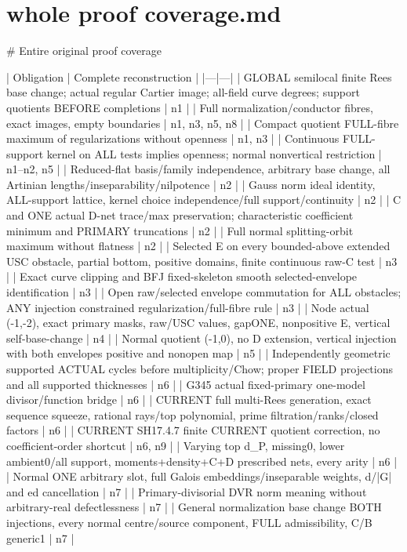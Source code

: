 \documentclass[11pt]{article}
\begin{document}
\section{whole proof coverage.md}
\begin{ReviewBody}
# Entire original proof coverage

| Obligation | Complete reconstruction |
|---|---|
| GLOBAL semilocal finite Rees base change; actual regular Cartier image; all-field curve degrees; support quotients BEFORE completions | n1 |
| Full normalization/conductor fibres, exact images, empty boundaries | n1, n3, n5, n8 |
| Compact quotient FULL-fibre maximum of regularizations without openness | n1, n3 |
| Continuous FULL-support kernel on ALL tests implies openness; normal nonvertical restriction | n1--n2, n5 |
| Reduced-flat basis/family independence, arbitrary base change, all Artinian lengths/inseparability/nilpotence | n2 |
| Gauss norm ideal identity, ALL-support lattice, kernel choice independence/full support/continuity | n2 |
| C and ONE actual D-net trace/max preservation; characteristic coefficient minimum and PRIMARY truncations | n2 |
| Full normal splitting-orbit maximum without flatness | n2 |
| Selected E on every bounded-above extended USC obstacle, partial bottom, positive domains, finite continuous raw-C test | n3 |
| Exact curve clipping and BFJ fixed-skeleton smooth selected-envelope identification | n3 |
| Open raw/selected envelope commutation for ALL obstacles; ANY injection constrained regularization/full-fibre rule | n3 |
| Node actual (-1,-2), exact primary masks, raw/USC values, gapONE, nonpositive E, vertical self-base-change | n4 |
| Normal quotient (-1,0), no D extension, vertical injection with both envelopes positive and nonopen map | n5 |
| Independently geometric supported ACTUAL cycles before multiplicity/Chow; proper FIELD projections and all supported thicknesses | n6 |
| G345 actual fixed-primary one-model divisor/function bridge | n6 |
| CURRENT full multi-Rees generation, exact sequence squeeze, rational rays/top polynomial, prime filtration/ranks/closed factors | n6 |
| CURRENT SH17.4.7 finite CURRENT quotient correction, no coefficient-order shortcut | n6, n9 |
| Varying top d_P, missing0, lower ambient0/all support, moments+density+C+D prescribed nets, every arity | n6 |
| Normal ONE arbitrary slot, full Galois embeddings/inseparable weights, d/|G| and ed cancellation | n7 |
| Primary-divisorial DVR norm meaning without arbitrary-real defectlessness | n7 |
| General normalization base change BOTH injections, every normal centre/source component, FULL admissibility, C/B generic1 | n7 |

\end{ReviewBody}
\end{document}
